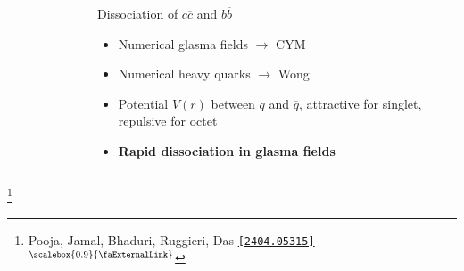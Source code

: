 \documentclass[aspectratio=169,11pt,usenames,dvipsnames]{beamer}
\renewcommand{\thefootnote}{\color{customblue}\faPaperPlaneO}
\newcommand\blfootnote[1]{%
  \begingroup
  \renewcommand\thefootnote{}\footnote{#1}%
  \addtocounter{footnote}{-1}%
  \endgroup
}
\begin{document}
\begin{frame}[t,noframenumbering]
\begin{columns}[onlytextwidth,t]
\begin{figure}
        \end{figure}
        \begin{center}
            {\Large\color{isgold} Dissociation of $c\overline{c}$ and $b\overline{b}$ \\[10pt]}
            \footnotesize
                \begin{itemize}
                    \item {\color{lightgray}Numerical glasma fields $\rightarrow$ CYM}
                    \item {\color{lightgray}Numerical heavy quarks $\rightarrow$ Wong}
                    \item {\color{lightgray}Potential $V(r)$ between $q$ and $\overline{q}$, attractive for singlet, repulsive for octet}\\[15pt]
                    \item {\color{destacado}\bfseries\normalsize{Rapid dissociation in glasma fields}}
                \end{itemize}
        \end{center}
    \end{columns}
    \blfootnote{\scriptsize Pooja, Jamal, Bhaduri, Ruggieri, Das \href{https://arxiv.org/abs/2404.05315}{\color{palgold}\texttt{[2404.05315]}$^\text{\scalebox{0.9}{\faExternalLink}}$}}
\end{frame}
\end{document}
